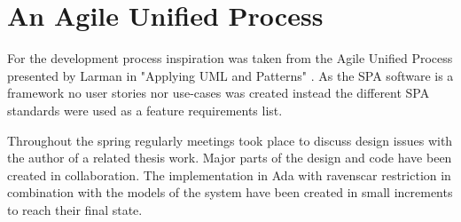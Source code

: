 \section{An Agile Unified Process}
For the development process inspiration was taken from the Agile Unified
Process presented by Larman in "Applying UML and Patterns" \cite{larman2005}.
As the SPA software is a framework no user stories nor use-cases was created
instead the different SPA standards were used as a feature requirements list.

Throughout the spring regularly meetings took place to discuss design issues
with the author of a related thesis work. Major parts of the design and code
have been created in collaboration. The implementation in Ada with ravenscar
restriction in combination with the models of the system have been created in
small increments to reach their final state.
